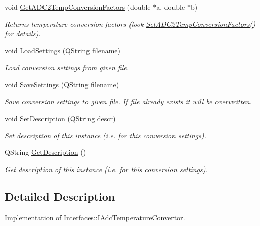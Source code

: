 \begin{DoxyCompactItemize}
void \hyperlink{class_adc_temperature_convertor_aeab56811467e8019731f1e2867a76671}{Get\+A\+D\+C2\+Temp\+Conversion\+Factors} (double $\ast$a, double $\ast$b)
\begin{DoxyCompactList}\small\item\em Returns temperature conversion factors (look \hyperlink{class_adc_temperature_convertor_a5a19355f805554763e914e5b2216d5f6}{Set\+A\+D\+C2\+Temp\+Conversion\+Factors()} for details). \end{DoxyCompactList}\item 
void \hyperlink{class_adc_temperature_convertor_affab0a66a3508e2eedd8bab3407ae80f}{Load\+Settings} (Q\+String filename)
\begin{DoxyCompactList}\small\item\em Load conversion settings from given file. \end{DoxyCompactList}\item 
void \hyperlink{class_adc_temperature_convertor_aa6935469c6bb9e2df9a21495d7e8b72a}{Save\+Settings} (Q\+String filename)
\begin{DoxyCompactList}\small\item\em Save conversion settings to given file. If file already exists it will be overwritten. \end{DoxyCompactList}\item 
void \hyperlink{class_adc_temperature_convertor_a56103443d7da4769339ddb685a0a8df0}{Set\+Description} (Q\+String descr)
\begin{DoxyCompactList}\small\item\em Set description of this instance (i.\+e. for this conversion settings). \end{DoxyCompactList}\item 
Q\+String \hyperlink{class_adc_temperature_convertor_ad82afdddbac46a95b6da44e769180d10}{Get\+Description} ()
\begin{DoxyCompactList}\small\item\em Get description of this instance (i.\+e. for this conversion settings). \end{DoxyCompactList}\end{DoxyCompactItemize}


\subsection{Detailed Description}
Implementation of \hyperlink{class_interfaces_1_1_i_adc_temperature_convertor}{Interfaces\+::\+I\+Adc\+Temperature\+Convertor}. 

